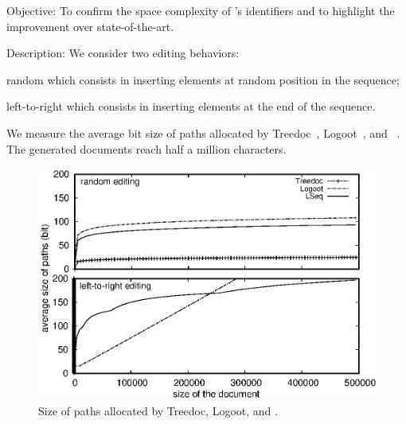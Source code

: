 \begin{asparadesc}
\item [Objective:] To confirm the space complexity of \LSEQ's identifiers and to
  highlight the improvement over state-of-the-art.
\item [Description:] We consider two editing behaviors:
  \begin{inparaenum}[(i)]
  \item random which consists in inserting elements at random position in the sequence;
  \item left-to-right which consists in inserting elements at the end of the
    sequence.
  \end{inparaenum} We measure the average bit size of paths allocated by
  Treedoc~\cite{preguica2009commutative}, Logoot~\cite{weiss2009logoot}, and
  \LSEQ~\cite{nedelec2013lseq}. The generated documents reach half a million
  characters.

\begin{figure}
  \centering
  \includegraphics[width=\columnwidth]{./img/space.eps}
  \caption{\label{fig:space}Size of paths allocated by Treedoc, Logoot, and
    \LSEQ.}
\end{figure}


\end{asparadesc}
